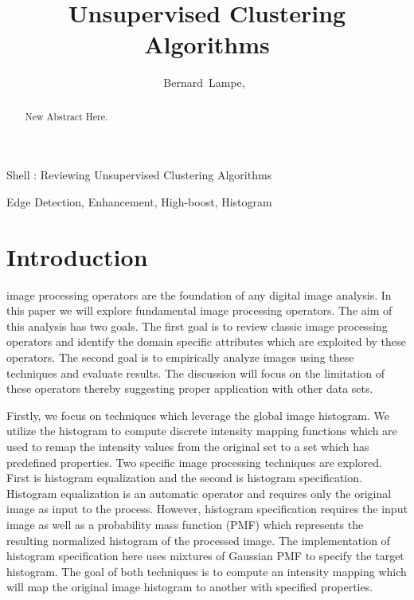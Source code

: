 \documentclass[journal]{IEEEtran}
\begin{document}
\title{Unsupervised Clustering Algorithms}

\author{Bernard~Lampe,~}

%
{Shell \MakeLowercase{\Lampe}: Reviewing Unsupervised Clustering Algorithms}

\maketitle

\begin{abstract}
New Abstract Here.
\end{abstract}

\begin{IEEEkeywords}
Edge Detection, Enhancement, High-boost, Histogram
\end{IEEEkeywords}

\section{Introduction}

 image processing operators are the foundation of any digital image analysis. In this paper we will explore fundamental image processing operators. The aim of this analysis has two goals. The first goal is to review classic image processing operators and identify the domain specific attributes which are exploited by these operators. The second goal is to empirically analyze images using these techniques and evaluate results. The discussion will focus on the limitation of these operators thereby suggesting proper application with other data sets.

\par Firstly, we focus on techniques which leverage the global image histogram. We utilize the histogram to compute discrete intensity mapping functions which are used to remap the intensity values from the original set to a set which has predefined properties. Two specific image processing techniques are explored. First is histogram equalization and the second is histogram specification. Histogram equalization is an automatic operator and requires only the original image as input to the process. However, histogram specification requires the input image as well as a probability mass function (PMF) which represents the resulting normalized histogram of the processed image. The implementation of histogram specification here uses mixtures of Gaussian PMF to specify the target histogram. The goal of both techniques is to compute an intensity mapping which will map the original image histogram to another with specified properties. \cite[p.~120-138]{Gonzalez}
\end{document}
